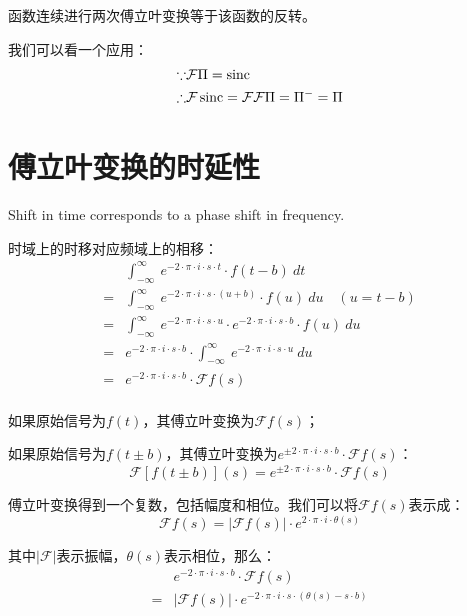 函数连续进行两次傅立叶变换等于该函数的反转。

我们可以看一个应用：
\begin{align*}
	\because   & \mathcal{F}\Pi=\operatorname{sinc}                                 \\
	\therefore & \mathcal{F}\operatorname{sinc}=\mathcal{F}\mathcal{F}\Pi=\Pi^-=\Pi
\end{align*}

\section{傅立叶变换的时延性}
Shift in time corresponds to a phase shift in frequency.

时域上的时移对应频域上的相移：
\begin{align*}
	  & \int_{-\infty}^{\infty}\ e^{-2\cdot \pi\cdot i\cdot s\cdot t}\cdot f(t-b)\ dt                                         \\
	= & \int_{-\infty}^{\infty}\ e^{-2\cdot \pi\cdot i\cdot s\cdot (u+b)}\cdot f(u)\ du\quad (u=t-b)                          \\
	= & \int_{-\infty}^{\infty}\ e^{-2\cdot \pi\cdot i\cdot s\cdot u}\cdot e^{-2\cdot \pi\cdot i\cdot s\cdot b}\cdot f(u)\ du \\
	= & e^{-2\cdot \pi\cdot i\cdot s\cdot b}\cdot \int_{-\infty}^{\infty}\ e^{-2\cdot \pi\cdot i\cdot s\cdot u}\ du           \\
	= & e^{-2\cdot \pi\cdot i\cdot s\cdot b}\cdot \mathcal{F}f(s)                                                             \\
\end{align*}


如果原始信号为$f(t)$，其傅立叶变换为$\mathcal{F}f(s)$；

如果原始信号为$f(t\pm b)$，其傅立叶变换为$e^{\pm 2\cdot \pi\cdot i\cdot s\cdot b}\cdot \mathcal{F}f(s)$：
\begin{equation}
	\mathcal{F}[f(t\pm b)](s)=e^{\pm 2\cdot \pi\cdot i\cdot s\cdot b}\cdot \mathcal{F}f(s)
\end{equation}

傅立叶变换得到一个复数，包括幅度和相位。我们可以将$\mathcal{F}f(s)$表示成：
$$
	\mathcal{F}f(s)=|\mathcal{F}f(s)|\cdot e^{2\cdot \pi\cdot i\cdot \theta(s)}
$$

其中$|\mathcal{F}|$表示振幅，$\theta(s)$表示相位，那么：
\begin{align*}
	  & e^{-2\cdot \pi\cdot i\cdot s\cdot b}\cdot \mathcal{F}f(s)                      \\
	= & |\mathcal{F}f(s)|\cdot e^{-2\cdot \pi\cdot i\cdot s\cdot (\theta(s)-s\cdot b)}
\end{align*}


